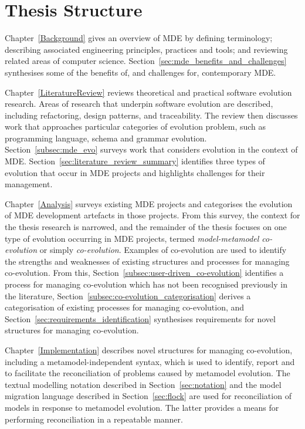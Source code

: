 
\section{Thesis Structure}
Chapter~\ref{Background} gives an overview of MDE by defining terminology; describing associated engineering principles, practices and tools; and reviewing related areas of computer science. Section~\ref{sec:mde_benefits_and_challenges} synthesises some of the benefits of, and challenges for, contemporary MDE.

Chapter~\ref{LiteratureReview} reviews theoretical and practical software evolution research. Areas of research that underpin software evolution are described, including refactoring, design patterns, and traceability. The review then discusses work that approaches particular categories of evolution problem, such as programming language, schema and grammar evolution. Section~\ref{subsec:mde_evo} surveys work that considers evolution in the context of MDE. Section~\ref{sec:literature_review_summary} identifies three types of evolution that occur in MDE projects and highlights challenges for their management.

Chapter~\ref{Analysis} surveys existing MDE projects and categorises the evolution of MDE development artefacts in those projects. From this survey, the context for the thesis research is narrowed, and the remainder of the thesis focuses on one type of evolution occurring in MDE projects, termed \emph{model-metamodel co-evolution} or simply \emph{co-evolution}. Examples of co-evolution are used to identify the strengths and weaknesses of existing structures and processes for managing co-evolution. From this, Section~\ref{subsec:user-driven_co-evolution} identifies a process for managing co-evolution which has not been recognised previously in the literature, Section~\ref{subsec:co-evolution_categorisation} derives a categorisation of existing processes for managing co-evolution, and Section~\ref{sec:requirements_identification} synthesises requirements for novel structures for managing co-evolution.

Chapter~\ref{Implementation} describes novel structures for managing co-evolution, including a me\-ta\-mo\-del-in\-de\-pe\-nd\-e\-nt syntax, which is used to identify, report and to facilitate the reconciliation of problems caused by metamodel evolution. The textual modelling notation described in Section~\ref{sec:notation} and the model migration language described in Section~\ref{sec:flock} are used for reconciliation of models in response to metamodel evolution. The latter provides a means for performing reconciliation in a repeatable manner.

